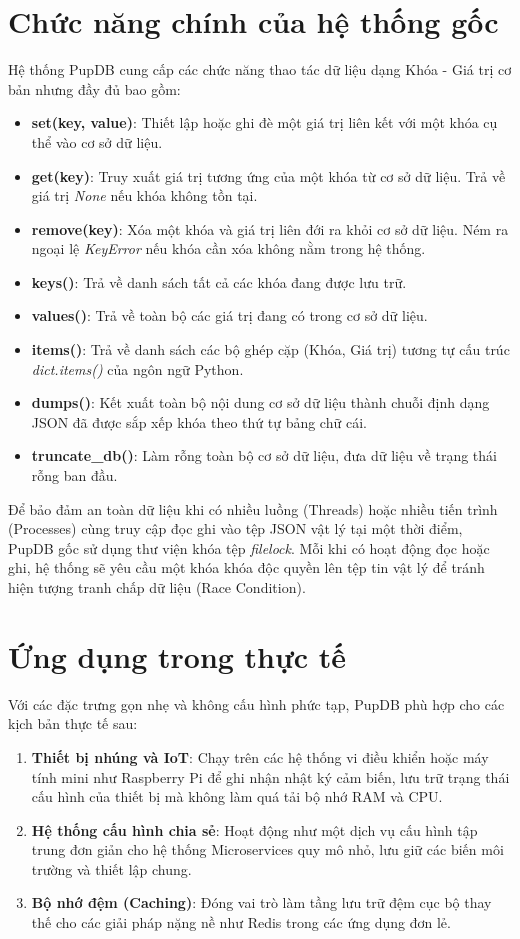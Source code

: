 \documentclass[12pt,a4paper]{report}
\begin{document}
\section{Chức năng chính của hệ thống gốc}
Hệ thống PupDB cung cấp các chức năng thao tác dữ liệu dạng Khóa - Giá trị cơ bản nhưng đầy đủ bao gồm:
\begin{itemize}
    \item \textbf{set(key, value)}: Thiết lập hoặc ghi đè một giá trị liên kết với một khóa cụ thể vào cơ sở dữ liệu.
    \item \textbf{get(key)}: Truy xuất giá trị tương ứng của một khóa từ cơ sở dữ liệu. Trả về giá trị \textit{None} nếu khóa không tồn tại.
    \item \textbf{remove(key)}: Xóa một khóa và giá trị liên đới ra khỏi cơ sở dữ liệu. Ném ra ngoại lệ \textit{KeyError} nếu khóa cần xóa không nằm trong hệ thống.
    \item \textbf{keys()}: Trả về danh sách tất cả các khóa đang được lưu trữ.
    \item \textbf{values()}: Trả về toàn bộ các giá trị đang có trong cơ sở dữ liệu.
    \item \textbf{items()}: Trả về danh sách các bộ ghép cặp (Khóa, Giá trị) tương tự cấu trúc \textit{dict.items()} của ngôn ngữ Python.
    \item \textbf{dumps()}: Kết xuất toàn bộ nội dung cơ sở dữ liệu thành chuỗi định dạng JSON đã được sắp xếp khóa theo thứ tự bảng chữ cái.
    \item \textbf{truncate\_db()}: Làm rỗng toàn bộ cơ sở dữ liệu, đưa dữ liệu về trạng thái rỗng ban đầu.
\end{itemize}
Để bảo đảm an toàn dữ liệu khi có nhiều luồng (Threads) hoặc nhiều tiến trình (Processes) cùng truy cập đọc ghi vào tệp JSON vật lý tại một thời điểm, PupDB gốc sử dụng thư viện khóa tệp \textit{filelock}. Mỗi khi có hoạt động đọc hoặc ghi, hệ thống sẽ yêu cầu một khóa khóa độc quyền lên tệp tin vật lý để tránh hiện tượng tranh chấp dữ liệu (Race Condition).

\section{Ứng dụng trong thực tế}
Với các đặc trưng gọn nhẹ và không cấu hình phức tạp, PupDB phù hợp cho các kịch bản thực tế sau:
\begin{enumerate}
    \item \textbf{Thiết bị nhúng và IoT}: Chạy trên các hệ thống vi điều khiển hoặc máy tính mini như Raspberry Pi để ghi nhận nhật ký cảm biến, lưu trữ trạng thái cấu hình của thiết bị mà không làm quá tải bộ nhớ RAM và CPU.
    \item \textbf{Hệ thống cấu hình chia sẻ}: Hoạt động như một dịch vụ cấu hình tập trung đơn giản cho hệ thống Microservices quy mô nhỏ, lưu giữ các biến môi trường và thiết lập chung.
    \item \textbf{Bộ nhớ đệm (Caching)}: Đóng vai trò làm tầng lưu trữ đệm cục bộ thay thế cho các giải pháp nặng nề như Redis trong các ứng dụng đơn lẻ.
\end{enumerate}
\end{document}
